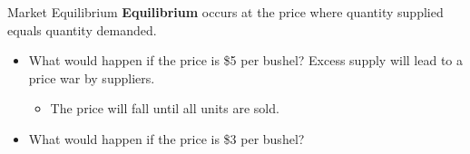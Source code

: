 \documentclass[12pt,t]{beamer}
\begin{document}
\begin{frame}{Market Equilibrium}
  \textbf{Equilibrium} occurs at the price where quantity supplied equals quantity demanded. 

  \begin{itemize}
    \item What would happen if the price is \$5 per bushel? Excess supply will lead to a price war by suppliers.
      \begin{itemize}
        \item The price will fall until all units are sold.
      \end{itemize}

    \item What would happen if the price is \$3 per bushel?
  \end{itemize}
\end{frame}
\end{document}
